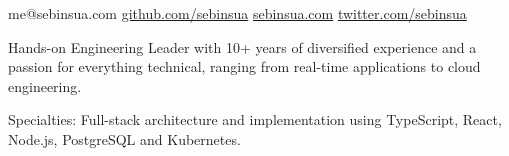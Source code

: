 \documentclass[10pt,a4paper]{article}
\begin{document}
\sloppy  %


\nobreakvspace{0.3em}  %

\noindent
me@sebinsua.com\sbull
\href{http://github.com/sebinsua}{github.com/sebinsua}\sbull
\href{http://sebinsua.com}{sebinsua.com}\sbull
\href{http://twitter.com/sebinsua}{twitter.com/sebinsua}

\spacedhrule{0.9em}{-0.4em}  %


\vspace{-0em}  %

\noindent Hands-on Engineering Leader with 10+ years of diversified experience and a passion for everything technical, ranging from real-time applications to cloud engineering.

\inlineheadsection  %
  {Specialties:}
  {Full-stack architecture and implementation using TypeScript, React, Node.js, PostgreSQL and Kubernetes.}

\spacedhrule{1.5em}{-0.4em}

\end{document}
